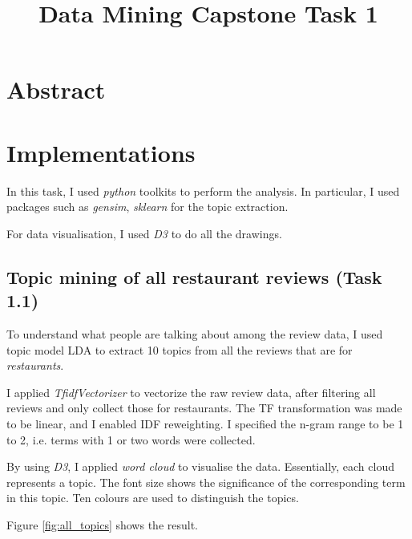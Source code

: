 \documentclass[11pt]{article}
\title{Data Mining Capstone Task 1}
\begin{document}
\maketitle

\section{Abstract}

\section{Implementations}
In this task, I used \emph{python} toolkits to perform the analysis.
In particular, I used packages such as \emph{gensim}, \emph{sklearn} for the topic extraction.

For data visualisation, I used \emph{D3} to do all the drawings.

\subsection{Topic mining of all restaurant reviews (Task 1.1)}
To understand what people are talking about among the review data, I used topic model LDA to extract 10 topics from all the reviews that are for \emph{restaurants}.

I applied \emph{TfidfVectorizer} to vectorize the raw review data, after filtering all reviews and only collect those for restaurants.
The TF transformation was made to be linear, and I enabled IDF reweighting.
I specified the n-gram range to be 1 to 2, i.e. terms with 1 or two words were collected.

By using \emph{D3}, I applied \emph{word cloud} to visualise the data.
Essentially, each cloud represents a topic. The font size shows the significance of the corresponding term in this topic.
Ten colours are used to distinguish the topics.

Figure \ref{fig:all_topics} shows the result.
\end{document}
